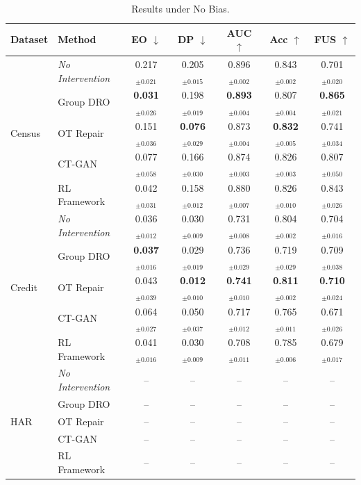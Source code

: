 \begin{table}[t]
\centering
\setlength{\tabcolsep}{5pt}
\caption{Results under No Bias.}
\label{tab:nobias_compressed}
\begin{tabular}{llccccc}
\toprule
Dataset & Method & EO $\downarrow$ & DP $\downarrow$ & AUC $\uparrow$ & Acc $\uparrow$ & FUS $\uparrow$ \\
\midrule
\multirow{5}{*}{Census} & \textit{No Intervention} & 0.217$_{\pm 0.021}$ & 0.205$_{\pm 0.015}$ & 0.896$_{\pm 0.002}$ & 0.843$_{\pm 0.002}$ & 0.701$_{\pm 0.020}$ \\
 & Group DRO & \textbf{0.031$_{\pm 0.026}$} & 0.198$_{\pm 0.019}$ & \textbf{0.893$_{\pm 0.004}$} & 0.807$_{\pm 0.004}$ & \textbf{0.865$_{\pm 0.021}$} \\
 & OT Repair & 0.151$_{\pm 0.036}$ & \textbf{0.076$_{\pm 0.029}$} & 0.873$_{\pm 0.004}$ & \textbf{0.832$_{\pm 0.005}$} & 0.741$_{\pm 0.034}$ \\
 & CT-GAN & 0.077$_{\pm 0.058}$ & 0.166$_{\pm 0.030}$ & 0.874$_{\pm 0.003}$ & 0.826$_{\pm 0.003}$ & 0.807$_{\pm 0.050}$ \\
 & RL Framework & 0.042$_{\pm 0.031}$ & 0.158$_{\pm 0.012}$ & 0.880$_{\pm 0.007}$ & 0.826$_{\pm 0.010}$ & 0.843$_{\pm 0.026}$ \\
\midrule
\multirow{5}{*}{Credit} & \textit{No Intervention} & 0.036$_{\pm 0.012}$ & 0.030$_{\pm 0.009}$ & 0.731$_{\pm 0.008}$ & 0.804$_{\pm 0.002}$ & 0.704$_{\pm 0.016}$ \\
 & Group DRO & \textbf{0.037$_{\pm 0.016}$} & 0.029$_{\pm 0.019}$ & 0.736$_{\pm 0.029}$ & 0.719$_{\pm 0.029}$ & 0.709$_{\pm 0.038}$ \\
 & OT Repair & 0.043$_{\pm 0.039}$ & \textbf{0.012$_{\pm 0.010}$} & \textbf{0.741$_{\pm 0.010}$} & \textbf{0.811$_{\pm 0.002}$} & \textbf{0.710$_{\pm 0.024}$} \\
 & CT-GAN & 0.064$_{\pm 0.027}$ & 0.050$_{\pm 0.037}$ & 0.717$_{\pm 0.012}$ & 0.765$_{\pm 0.011}$ & 0.671$_{\pm 0.026}$ \\
 & RL Framework & 0.041$_{\pm 0.016}$ & 0.030$_{\pm 0.009}$ & 0.708$_{\pm 0.011}$ & 0.785$_{\pm 0.006}$ & 0.679$_{\pm 0.017}$ \\
\midrule
\multirow{5}{*}{HAR} & \textit{No Intervention} & -- & -- & -- & -- & -- \\
 & Group DRO & -- & -- & -- & -- & -- \\
 & OT Repair & -- & -- & -- & -- & -- \\
 & CT-GAN & -- & -- & -- & -- & -- \\
 & RL Framework & -- & -- & -- & -- & -- \\
\bottomrule
\end{tabular}
\end{table}

